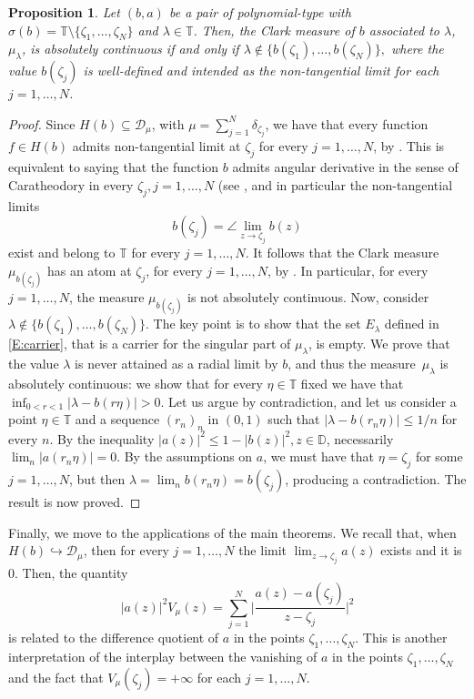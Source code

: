 \documentclass[12pt]{amsart}
\newtheorem{proposition}[theorem]{Proposition}
\theoremstyle{definition}
\theoremstyle{remark}
\theoremstyle{remark}
\begin{document}
\begin{proposition}
Let $(b,a)$ be a pair of polynomial-type with $\sigma(b)=\mathbb{T}\setminus\{\zeta_1,\ldots,\zeta_N\}$ and $\lambda\in\mathbb{T}$. Then, the Clark measure of $b$ associated to $\lambda$, $\mu_\lambda$, is absolutely continuous if and only if $\lambda\notin\{b(\zeta_1),\ldots,b(\zeta_N)\},$ where the value $b(\zeta_j)$ is well-defined and intended as the non-tangential limit for each $j=1,\ldots,N$.
\end{proposition}

\begin{proof}
    Since $H(b)\subseteq\mathcal{D}_\mu$, with $\mu=\sum_{j=1}^N\delta_{\zeta_j}$, we have that every function $f\in H(b)$ admits non-tangential limit at $\zeta_j$ for every $j=1,\ldots,N$, by \cite[Theorem 7.2.1]{primer}. This is equivalent to saying that the function $b$ admits angular derivative in the sense of Caratheodory in every $\zeta_j, j=1,\ldots,N$ (see \cite[Theorem 21.1]{hb2}, and in particular the non-tangential limits
\[b(\zeta_j)=\angle\lim_{z\to\zeta_j} b(z)\]
exist and belong to $\mathbb{T}$ for every $j=1,\ldots,N$. It follows that the Clark measure~$\mu_{b(\zeta_j)}$ has an atom at $\zeta_j$, for every $j=1,\ldots,N$, by \cite[Theorem 21.5]{hb2}. In particular, for every $j=1,\ldots,N$, the measure $\mu_{b(\zeta_j)}$ is not absolutely continuous. Now, consider $\lambda\notin\{ b(\zeta_1), \ldots, b(\zeta_N) \}$. The key point is to show that the set $E_\lambda$ defined in \eqref{E:carrier}, that is a carrier for the singular part of $\mu_\lambda$, is empty. We prove that the value $\lambda$ is never attained as a radial limit by $b$, and thus the measure~$\mu_\lambda$ is absolutely continuous: we show that for every $\eta\in\mathbb{T}$ fixed we have that $\inf_{0<r<1}|\lambda-b(r\eta)|>0$. Let us argue by contradiction, and let us consider a point $\eta\in\mathbb{T}$ and a sequence $(r_n)_n$ in $(0,1)$ such that $|\lambda-b(r_n\eta)|\leq 1/n$ for every $n$. By the inequality $|a(z)|^2\leq1-|b(z)|^2,z\in\mathbb{D}$,  necessarily $\lim_{n}|a(r_n\eta)|=0$. By the assumptions on $a$, we must have that $\eta=\zeta_j$ for some $j=1,\ldots,N$, but then $\lambda = \lim_n b(r_n \eta) = b(\zeta_j)$, producing a contradiction. The result is now proved.
\end{proof}


Finally, we move to the applications of the main theorems. We recall that, when $H(b) \hookrightarrow \mathcal{D}_\mu$, then for every $j=1,\ldots,N$ the limit $\lim_{z\to\zeta_j}a(z)$ exists and it is $0$. Then, the quantity 
\[|a(z)|^2V_\mu(z)=\sum_{j=1}^N \bigg|\frac{a(z)-a(\zeta_j)}{z-\zeta_j}\bigg|^2\]
is related to the difference quotient of $a$ in the points $\zeta_1,\ldots,\zeta_N$. This is another interpretation of the interplay between the vanishing of $a$ in the points $\zeta_1,\ldots,\zeta_N$ and the fact that $V_\mu(\zeta_j)=+\infty$ for each $j=1,\ldots,N$.
\end{document}
